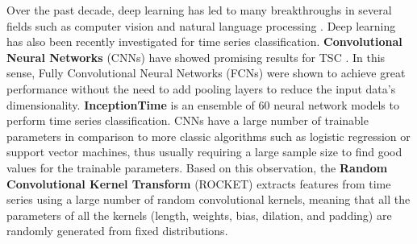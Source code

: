 Over the past decade, deep learning has led to many breakthroughs in several fields such as computer vision \cite{fawaz2019deep} and natural language processing \cite{floridi2020gpt}. Deep learning has also been recently investigated for time series classification.
\textbf{Convolutional Neural Networks} (CNNs) have showed promising results for TSC \cite{wang2017time}. %
In this sense, Fully Convolutional Neural Networks (FCNs) \cite{wang2017time} were shown to achieve great performance without the need to add pooling layers to reduce the input data's dimensionality. 
\textbf{InceptionTime} \cite{fawaz2019deep} is an ensemble of 60 neural network models to perform time series classification. %
CNNs have a large number of trainable parameters in comparison to more classic algorithms such as logistic regression or support vector machines, thus usually requiring a large sample size to find good values for the trainable parameters. Based on this observation, the \textbf{Random Convolutional Kernel Transform} (ROCKET) \cite{dempster2020rocket} extracts features from time series using a large number of random convolutional kernels, meaning that all the parameters of all the kernels (length, weights, bias, dilation, and padding) are randomly generated from fixed distributions. 


